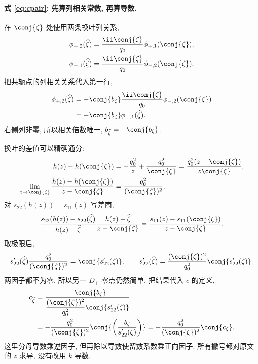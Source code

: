 \paragraph{式 \eqref{eq:cpair}: 先算列相关常数, 再算导数.}
在 $\conj{\zeta}$ 处使用两条换叶列关系,
\begin{align*}
\phi_{+,2}(\widehat\zeta)
&=\dfrac{\ii\conj{\zeta}}{q_0}\phi_{+,1}(\conj{\zeta}),\\
\phi_{-,1}(\widehat\zeta)
&=\dfrac{\ii\conj{\zeta}}{q_0}\phi_{-,2}(\conj{\zeta}).
\end{align*}
把共轭点的列相关关系代入第一行,
\begin{align*}
\phi_{+,2}(\widehat\zeta)
&=-\conj{b_\zeta}\dfrac{\ii\conj{\zeta}}{q_0}
\phi_{-,2}(\conj{\zeta})\\
&=-\conj{b_\zeta}\phi_{-,1}(\widehat\zeta).
\end{align*}
右侧列非零, 所以相关倍数唯一,
$b_{\widehat\zeta}=-\conj{b_\zeta}$.

换叶的差值可以精确通分:
\begin{align*}
h(z)-h(\conj{\zeta})
&=-\dfrac{q_0^2}{z}+\dfrac{q_0^2}{\conj{\zeta}}
=\dfrac{q_0^2(z-\conj{\zeta})}{z\conj{\zeta}},\\
\lim\limits_{z\to\conj{\zeta}}
\dfrac{h(z)-h(\conj{\zeta})}{z-\conj{\zeta}}
&=\dfrac{q_0^2}{(\conj{\zeta})^2}.
\end{align*}
对 $s_{22}(h(z))=s_{11}(z)$ 写差商,
\[
\dfrac{s_{22}(h(z))-s_{22}(\widehat\zeta)}{h(z)-\widehat\zeta}
\dfrac{h(z)-\widehat\zeta}{z-\conj{\zeta}}
=\dfrac{s_{11}(z)-s_{11}(\conj{\zeta})}{z-\conj{\zeta}}.
\]
取极限后,
\[
s_{22}'(\widehat\zeta)\dfrac{q_0^2}{(\conj{\zeta})^2}
=\conj{s_{22}'(\zeta)},
\qquad
s_{22}'(\widehat\zeta)
=\dfrac{(\conj{\zeta})^2}{q_0^2}\conj{s_{22}'(\zeta)}.
\]
两因子都不为零, 所以另一 $D_+$ 零点仍然简单.
把结果代入 $c$ 的定义,
\begin{align*}
c_{\widehat\zeta}
&=\dfrac{-\conj{b_\zeta}}
{\dfrac{(\conj{\zeta})^2}{q_0^2}\conj{s_{22}'(\zeta)}}\\
&=-\dfrac{q_0^2}{(\conj{\zeta})^2}
\conj{\left(\dfrac{b_\zeta}{s_{22}'(\zeta)}\right)}
=-\dfrac{q_0^2}{(\conj{\zeta})^2}\conj{c_\zeta}.
\end{align*}
这里分母导数乘逆因子, 但再除以导数使留数系数乘正向因子.
所有撇号都对原文的 $z$ 求导, 没有改用 $k$ 导数.

